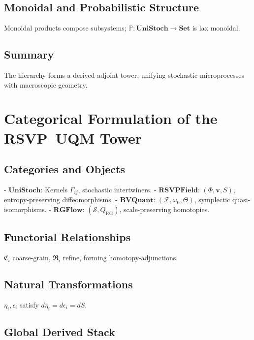 \documentclass[12pt]{article}
\begin{document}
\subsection{Monoidal and Probabilistic Structure}

Monoidal products compose subsystems; \(\mathbb{P}: \mathbf{UniStoch} \to \mathbf{Set}\) is lax monoidal.

\subsection{Summary}

The hierarchy forms a derived adjoint tower, unifying stochastic microprocesses with macroscopic geometry.

\section{Categorical Formulation of the RSVP–UQM Tower}
\label{app:categorical-tower}

\subsection{Categories and Objects}

- \(\mathbf{UniStoch}\): Kernels \(\Gamma_{ij}\), stochastic intertwiners.
- \(\mathbf{RSVPField}\): \((\Phi, \mathbf{v}, S)\), entropy-preserving diffeomorphisms.
- \(\mathbf{BVQuant}\): \((\mathcal{F}, \omega_0, \Theta)\), symplectic quasi-isomorphisms.
- \(\mathbf{RGFlow}\): \((\mathcal{S}, Q_{\mathrm{RG}})\), scale-preserving homotopies.

\subsection{Functorial Relationships}

\(\mathfrak{C}_i\) coarse-grain, \(\mathfrak{R}_i\) refine, forming homotopy-adjunctions.

\subsection{Natural Transformations}

\(\eta_i, \epsilon_i\) satisfy \(d \eta_i = d \epsilon_i = dS\).

\subsection{Global Derived Stack}
\end{document}
